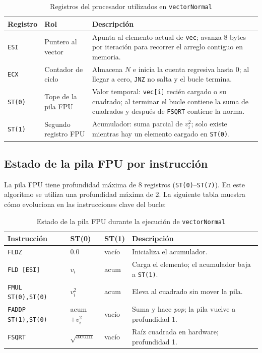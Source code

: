 \documentclass[12pt, letterpaper]{article}
\begin{document}
\begin{table}[H]
    \centering
    \begin{tabular}{@{}llp{7.5cm}@{}}
        \toprule
        \textbf{Registro} & \textbf{Rol} & \textbf{Descripción} \\
        \midrule
        \texttt{ESI} & Puntero al vector  & Apunta al elemento actual de \texttt{vec}; avanza 8 bytes por iteración para recorrer el arreglo contiguo en memoria. \\
        \texttt{ECX} & Contador de ciclo  & Almacena $N$ e inicia la cuenta regresiva hasta 0; al llegar a cero, \texttt{JNZ} no salta y el bucle termina. \\
        \texttt{ST(0)} & Tope de la pila FPU & Valor temporal: \texttt{vec[i]} recién cargado o su cuadrado; al terminar el bucle contiene la suma de cuadrados y después de \texttt{FSQRT} contiene la norma. \\
        \texttt{ST(1)} & Segundo registro FPU & Acumulador: suma parcial de $v_i^2$; solo existe mientras hay un elemento cargado en \texttt{ST(0)}. \\
        \bottomrule
    \end{tabular}
    \caption{Registros del procesador utilizados en \texttt{vectorNormal}}
\end{table}

\subsection{Estado de la pila FPU por instrucción}

La pila FPU tiene profundidad máxima de 8 registros (\texttt{ST(0)}--\texttt{ST(7)}). En este algoritmo se utiliza una profundidad máxima de 2. La siguiente tabla muestra cómo evoluciona en las instrucciones clave del bucle:

\begin{table}[H]
    \centering
    \begin{tabular}{@{}llll@{}}
        \toprule
        \textbf{Instrucción} & \textbf{ST(0)} & \textbf{ST(1)} & \textbf{Descripción} \\
        \midrule
        \texttt{FLDZ}              & 0.0         & vacío       & Inicializa el acumulador. \\
        \texttt{FLD [ESI]}         & $v_i$       & acum        & Carga el elemento; el acumulador baja a \texttt{ST(1)}. \\
        \texttt{FMUL ST(0),ST(0)}  & $v_i^2$     & acum        & Eleva al cuadrado sin mover la pila. \\
        \texttt{FADDP ST(1),ST(0)} & acum$+v_i^2$  & vacío     & Suma y hace \textit{pop}; la pila vuelve a profundidad 1. \\
        \texttt{FSQRT}             & $\sqrt{\text{acum}}$ & vacío & Raíz cuadrada en hardware; profundidad 1. \\
        \bottomrule
    \end{tabular}
    \caption{Estado de la pila FPU durante la ejecución de \texttt{vectorNormal}}
\end{table}
\end{document}
